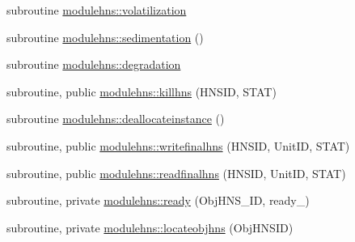\begin{DoxyCompactItemize}
subroutine \mbox{\hyperlink{namespacemodulehns_afbe73cf1017e84dcb207a4be7e224a29}{modulehns\+::volatilization}}
\item 
subroutine \mbox{\hyperlink{namespacemodulehns_ab96db95d39d4bc3d33b5266fe71250e6}{modulehns\+::sedimentation}} ()
\item 
subroutine \mbox{\hyperlink{namespacemodulehns_a378c8e88593c5f512652c5189a9a9729}{modulehns\+::degradation}}
\item 
subroutine, public \mbox{\hyperlink{namespacemodulehns_ae9cbb1085170907acb10a56c08c0a669}{modulehns\+::killhns}} (H\+N\+S\+ID, S\+T\+AT)
\item 
subroutine \mbox{\hyperlink{namespacemodulehns_a3c016aeb7936c47cd4071d8b9aa3ac75}{modulehns\+::deallocateinstance}} ()
\item 
subroutine, public \mbox{\hyperlink{namespacemodulehns_abf878e74b0b3dfd62305bbe1afe7b434}{modulehns\+::writefinalhns}} (H\+N\+S\+ID, Unit\+ID, S\+T\+AT)
\item 
subroutine, public \mbox{\hyperlink{namespacemodulehns_a41374dfc4d54eb48869c9b6727298941}{modulehns\+::readfinalhns}} (H\+N\+S\+ID, Unit\+ID, S\+T\+AT)
\item 
subroutine, private \mbox{\hyperlink{namespacemodulehns_a1b4bda03d346568b51278fca35b05366}{modulehns\+::ready}} (Obj\+H\+N\+S\+\_\+\+ID, ready\+\_\+)
\item 
subroutine, private \mbox{\hyperlink{namespacemodulehns_aff869b6b5dffbe4b2d00b777a1c0455d}{modulehns\+::locateobjhns}} (Obj\+H\+N\+S\+ID)
\end{DoxyCompactItemize}
